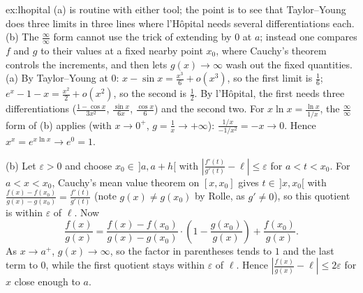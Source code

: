 \begin{solution}{ex:lhopital}
\idea (a) is routine with either tool; the point is to see that Taylor--Young does three limits in three lines where l'H\^opital needs several differentiations each. (b) The $\frac\infty\infty$ form cannot use the trick of extending by $0$ at $a$; instead one compares $f$ and $g$ to their values at a fixed nearby point $x_0$, where Cauchy's theorem controls the increments, and then lets $g(x)\to\infty$ wash out the fixed quantities.
\writeup (a) By Taylor--Young at $0$: $x-\sin x=\frac{x^3}6+o(x^3)$, so the first limit is $\frac16$; $e^x-1-x=\frac{x^2}2+o(x^2)$, so the second is $\frac12$. By l'H\^opital, the first needs three differentiations ($\frac{1-\cos x}{3x^2}$, $\frac{\sin x}{6x}$, $\frac{\cos x}6$) and the second two. For $x\ln x=\frac{\ln x}{1/x}$, the $\frac\infty\infty$ form of (b) applies (with $x\to0^+$, $g=\frac1x\to+\infty$): $\frac{1/x}{-1/x^2}=-x\to0$. Hence $x^x=e^{x\ln x}\to e^0=1$.

(b) Let $\varepsilon>0$ and choose $x_0\in\,]a,a+h[$ with $\left|\frac{f'(t)}{g'(t)}-\ell\right|\le\varepsilon$ for $a<t<x_0$. For $a<x<x_0$, Cauchy's mean value theorem on $[x,x_0]$ gives $t\in\,]x,x_0[$ with $\frac{f(x)-f(x_0)}{g(x)-g(x_0)}=\frac{f'(t)}{g'(t)}$ (note $g(x)\ne g(x_0)$ by Rolle, as $g'\ne0$), so this quotient is within $\varepsilon$ of $\ell$. Now
\[
\frac{f(x)}{g(x)}=\frac{f(x)-f(x_0)}{g(x)-g(x_0)}\cdot\left(1-\frac{g(x_0)}{g(x)}\right)+\frac{f(x_0)}{g(x)}.
\]
As $x\to a^+$, $g(x)\to\infty$, so the factor in parentheses tends to $1$ and the last term to $0$, while the first quotient stays within $\varepsilon$ of $\ell$. Hence $\left|\frac{f(x)}{g(x)}-\ell\right|\le2\varepsilon$ for $x$ close enough to $a$.
\end{solution}

